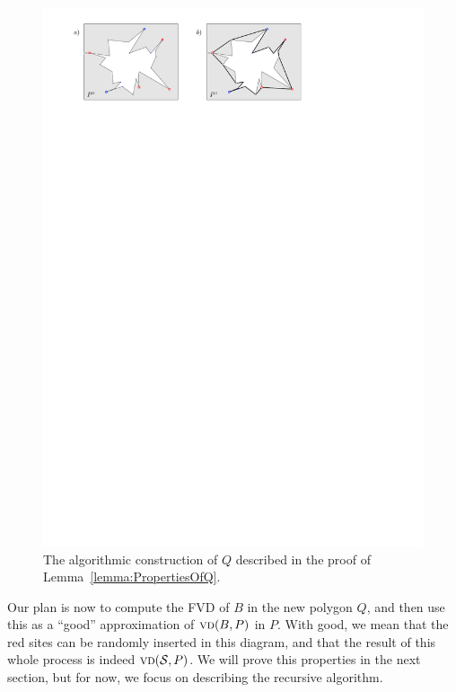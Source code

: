 \documentclass[a4paper, 11pt]{article}
\newcommand{\s}{\mathcal S}
\newcommand{\vd}[2][P]{\textsc{vd}(#2, #1)}
\begin{document}
\begin{figure}[t]
\centering
\includegraphics{imgConstructingQ.pdf}
\caption{The algorithmic construction of $Q$ described in the proof of Lemma~\ref{lemma:PropertiesOfQ}.}
\label{fig:ConstructingQ}
\end{figure}

Our plan is now to compute the FVD of $B$ in the new polygon $Q$, and then use this as a ``good'' approximation of $\vd{B}$ in $P$. 
With good, we mean that the red sites can be randomly inserted in this diagram, and that the result of this whole process is indeed $\vd{\s}$. 
We will prove this properties in the next section, but for now, we focus on describing the recursive algorithm.
\end{document}
